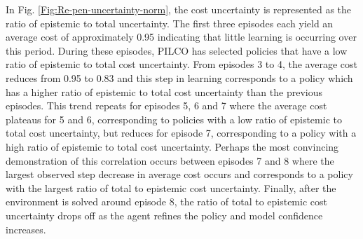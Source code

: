 In Fig. \ref{Fig:Re-pen-uncertainty-norm}, the cost uncertainty is represented as the ratio of epistemic to total uncertainty. The first three episodes each yield an average cost of approximately 0.95 indicating that little learning is occurring over this period. During these episodes, PILCO has selected policies that have a low ratio of epistemic to total cost uncertainty. From episodes 3 to 4, the average cost reduces from 0.95 to 0.83 and this step in learning corresponds to a policy which has a higher ratio of epistemic to total cost uncertainty than the previous episodes. This trend repeats for episodes 5, 6 and 7 where the average cost plateaus for 5 and 6, corresponding to policies with a low ratio of epistemic to total cost uncertainty, but reduces for episode 7, corresponding to a policy with a high ratio of epistemic to total cost uncertainty. Perhaps the most convincing demonstration of this correlation occurs between episodes 7 and 8 where the largest observed step decrease in average cost occurs and corresponds to a policy with the largest ratio of total to epistemic cost uncertainty. Finally, after the environment is solved around episode 8, the ratio of total to epistemic cost uncertainty drops off as the agent refines the policy and model confidence increases. 

